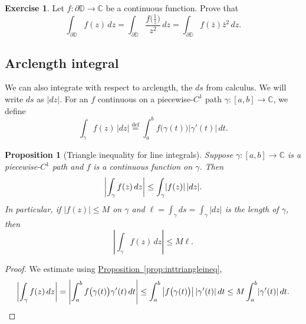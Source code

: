 \documentclass[12pt,openany]{book}
\newcommand{\avoidbreak}{\postdisplaypenalty=100}
\newcommand{\sabs}[1]{\lvert {#1} \rvert}
\newcommand{\abs}[1]{\left\lvert {#1} \right\rvert}
\newcommand{\C}{{\mathbb{C}}}
\newcommand{\D}{{\mathbb{D}}}
\theoremstyle{plain}
\newtheorem{prop}[thm]{Proposition}
\theoremstyle{remark}
\theoremstyle{definition}
\newenvironment{exbox}{%
    \def\FrameCommand{\vrule width 1pt \relax\hspace{10pt}}%
    \MakeFramed{\advance\hsize-\width\FrameRestore}%
}{%
    \endMakeFramed
}
\theoremstyle{exercise}
\newtheorem{exercise}{Exercise}[section]
\theoremstyle{example}
\newcommand{\propref}[1]{\hyperref[#1]{Proposition~\ref*{#1}}}
\begin{document}
\begin{exbox}
\begin{exercise}
Let $f \colon \partial \D \to \C$ be a continuous function.  Prove that
\begin{equation*}
\int_{\partial \D} f(z) \, dz
=
\int_{\partial \D} \frac{f\bigl(\frac{1}{z}\bigr)}{z^2} \, dz
=
\int_{\partial \D} f(\bar{z}) \bar{z}^2 \, dz .
\end{equation*}
\end{exercise}
\end{exbox}

\subsection{Arclength integral}

We can also integrate with respect to arclength, the $ds$ from calculus.
We will write $ds$ as $\sabs{dz}$.  For an $f$ continuous on
a piecewise-$C^1$ path $\gamma \colon [a,b] \to \C$,
we define
\begin{equation*}
\int_\gamma f(z) \, \sabs{dz}
\overset{\text{def}}{=}
\int_a^b f\bigl( \gamma(t) \bigr) \sabs{\gamma'(t)} \, dt .
\end{equation*}


\begin{prop}[Triangle inequality for line integrals]%
Suppose $\gamma \colon [a,b] \to \C$ is 
a piecewise-$C^1$ path and $f$ is a continuous function on
$\gamma$.  Then
\begin{equation*}
\abs{\int_\gamma f(z) \, dz} \leq \int_\gamma \sabs{f(z)} \, \sabs{dz} .
\avoidbreak
\end{equation*}
In particular, if $\sabs{f(z)} \leq M$ on $\gamma$ and $\ell = \int_\gamma ds
= \int_{\gamma} \sabs{dz}$ is the length of $\gamma$, then
\begin{equation*}
\abs{\int_\gamma f(z) \, dz} \leq M \ell .
\end{equation*}
\end{prop} 

\begin{proof}
We estimate using \propref{prop:inttriangleineq},
\begin{equation*}
\abs{\int_\gamma f(z) \, dz}
=
\abs{\int_a^b f\bigl( \gamma(t) \bigr) \gamma'(t) \, dt}
\leq
\int_a^b \abs{ f\bigl( \gamma(t) \bigr) }  \sabs{ \gamma'(t) } \, dt
\leq
M
\int_a^b \sabs{ \gamma'(t) } \, dt .
\qedhere
\end{equation*}
\end{proof}
\end{document}
